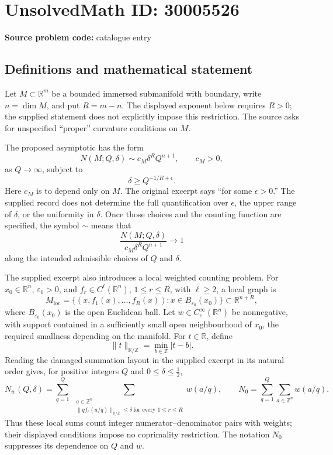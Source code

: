 \documentclass[11pt]{article}
\newcommand{\Z}{\mathbb{Z}}
\newcommand{\R}{\mathbb{R}}
\begin{document}
\section*{UnsolvedMath ID: 30005526}
\textbf{Source problem code:} catalogue entry
\subsection{Definitions and mathematical statement}
Let \(M\subset\R^m\) be a bounded immersed submanifold with boundary, write \(n=\dim M\), and put \(R=m-n\). The displayed exponent below requires \(R>0\); the supplied statement does not explicitly impose this restriction. The source asks for unspecified ``proper'' curvature conditions on \(M\).

The proposed asymptotic has the form
\[
N(M;Q,\delta)\sim c_M\delta^R Q^{n+1},\qquad c_M>0,
\]
as \(Q\to\infty\), subject to
\[
\delta\ge Q^{-1/R+\epsilon}.
\]
Here \(c_M\) is to depend only on \(M\). The original excerpt says ``for some \(\epsilon>0\).'' The supplied record does not determine the full quantification over \(\epsilon\), the upper range of \(\delta\), or the uniformity in \(\delta\). Once those choices and the counting function are specified, the symbol \(\sim\) means that
\[
\frac{N(M;Q,\delta)}{c_M\delta^R Q^{n+1}}\longrightarrow 1
\]
along the intended admissible choices of \(Q\) and \(\delta\).

The supplied excerpt also introduces a local weighted counting problem. For \(x_0\in\R^n\), \(\varepsilon_0>0\), and \(f_r\in C^\ell(\R^n)\), \(1\le r\le R\), with \(\ell\ge2\), a local graph is
\[
M_{\mathrm{loc}}=\{(x,f_1(x),\ldots,f_R(x)):x\in B_{\varepsilon_0}(x_0)\}\subset\R^{n+R},
\]
where \(B_{\varepsilon_0}(x_0)\) is the open Euclidean ball. Let \(w\in C_c^\infty(\R^n)\) be nonnegative, with support contained in a sufficiently small open neighbourhood of \(x_0\), the required smallness depending on the manifold. For \(t\in\R\), define
\[
\|t\|_{\R/\Z}=\min_{b\in\Z}|t-b|.
\]
Reading the damaged summation layout in the supplied excerpt in its natural order gives, for positive integers \(Q\) and \(0\le\delta\le\tfrac12\),
\[
N_w(Q,\delta)=\sum_{q=1}^{Q}\ \sum_{\substack{a\in\Z^n\\ \|qf_r(a/q)\|_{\R/\Z}\le\delta\ \text{for every }1\le r\le R}}w(a/q),
\qquad
N_0=\sum_{q=1}^{Q}\sum_{a\in\Z^n}w(a/q).
\]
Thus these local sums count integer numerator--denominator pairs with weights; their displayed conditions impose no coprimality restriction. The notation \(N_0\) suppresses its dependence on \(Q\) and \(w\).
\end{document}
